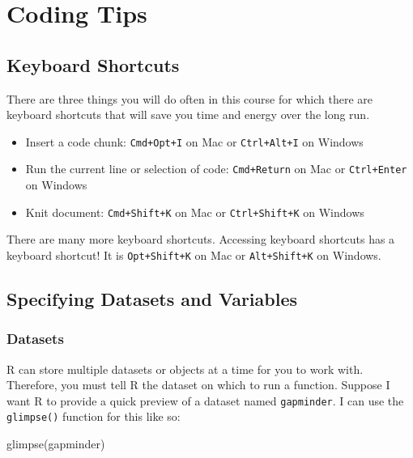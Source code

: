 \documentclass[
]{book}
\makeatletter
\newenvironment{Shaded}{\begin{snugshade}}{\end{snugshade}}
\newcommand{\FunctionTok}[1]{\textcolor[rgb]{0,0,0}{#1}}
\newcommand{\NormalTok}[1]{#1}
\providecommand{\tightlist}{%
  \setlength{\itemsep}{0pt}\setlength{\parskip}{0pt}}
\newenvironment{kframe}{%
\medskip{}
\setlength{\fboxsep}{.8em}
 \def\at@end@of@kframe{}%
 \ifinner\ifhmode%
  \def\at@end@of@kframe{\end{minipage}}%
  \begin{minipage}{\columnwidth}%
 \fi\fi%
 \def\FrameCommand##1{\hskip\@totalleftmargin \hskip-\fboxsep
 \colorbox{shadecolor}{##1}\hskip-\fboxsep
     \hskip-\linewidth \hskip-\@totalleftmargin \hskip\columnwidth}%
 \MakeFramed {\advance\hsize-\width
   \@totalleftmargin\z@ \linewidth\hsize
   \@setminipage}}%
 {\par\unskip\endMakeFramed%
 \at@end@of@kframe}
\renewenvironment{Shaded}{\begin{kframe}}{\end{kframe}}
\makeatother
\begin{document}
\hypertarget{appendix-appendix}{%
\appendix {}}


\hypertarget{coding-tips}{%
\chapter{Coding Tips}\label{coding-tips}}

\hypertarget{keyboard-shortcuts}{%
\section{Keyboard Shortcuts}\label{keyboard-shortcuts}}

There are three things you will do often in this course for which there are keyboard shortcuts that will save you time and energy over the long run.

\begin{itemize}
\tightlist
\item
  Insert a code chunk: \texttt{Cmd+Opt+I} on Mac or \texttt{Ctrl+Alt+I} on Windows
\item
  Run the current line or selection of code: \texttt{Cmd+Return} on Mac or \texttt{Ctrl+Enter} on Windows
\item
  Knit document: \texttt{Cmd+Shift+K} on Mac or \texttt{Ctrl+Shift+K} on Windows
\end{itemize}

There are many more keyboard shortcuts. Accessing keyboard shortcuts has a keyboard shortcut! It is \texttt{Opt+Shift+K} on Mac or \texttt{Alt+Shift+K} on Windows.

\hypertarget{specifying-datasets-and-variables}{%
\section{Specifying Datasets and Variables}\label{specifying-datasets-and-variables}}

\hypertarget{datasets}{%
\subsection{Datasets}\label{datasets}}

R can store multiple datasets or objects at a time for you to work with. Therefore, you must tell R the dataset on which to run a function. Suppose I want R to provide a quick preview of a dataset named \texttt{gapminder}. I can use the \texttt{glimpse()} function for this like so:

\begin{Shaded}
\begin{Highlighting}[]
\FunctionTok{glimpse}\NormalTok{(gapminder)}
\end{Highlighting}
\end{Shaded}
\end{document}
